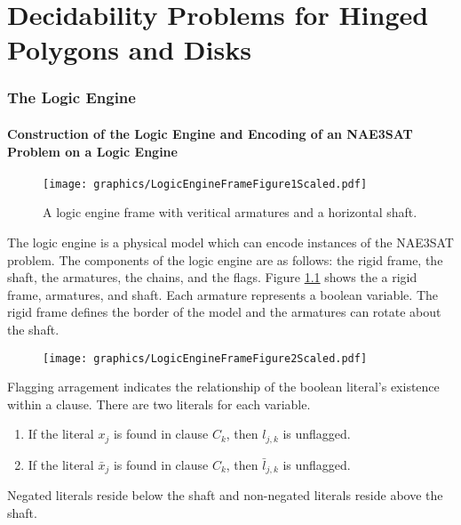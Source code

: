 \chapter{Decidability Problems for Hinged Polygons and Disks}
\subsection{The Logic Engine}
\subsubsection{Construction of the Logic Engine and Encoding of an NAE3SAT Problem on a Logic 
Engine}
\begin{figure}[!h]
\begin{center}
\texttt{[image: graphics/LogicEngineFrameFigure1Scaled.pdf]}
\caption{A logic engine frame with veritical armatures and a horizontal 
shaft.}\label{fig:LogicEngineFrameFigure1.pdf}
\end{center}
\end{figure}
The logic engine is a physical model which can encode instances of the NAE3SAT problem.  The 
components of the logic engine are as follows: the rigid frame, the shaft, the armatures,
the chains, and the flags.  Figure \ref{fig:LogicEngineFrameFigure1.pdf} shows the a rigid frame, 
armatures, and shaft.  Each armature represents a boolean variable.  The rigid frame defines the border 
of the model and the armatures can rotate about the shaft.
\begin{figure}[!h]
\begin{center}
\texttt{[image: graphics/LogicEngineFrameFigure2Scaled.pdf]}
\caption{}\label{fig:LogicEngineFrameFigure2.pdf}
\end{center}
\end{figure}
Flagging arragement indicates the relationship of the boolean literal's existence within a clause.  There are two literals for each variable.  
\begin{enumerate}
 \item If the literal $x_j$ is found in clause $C_k$, then $l_{j,k}$ is unflagged.
 \item If the literal $\bar{x}_j$ is found in clause $C_k$, then $\bar{l}_{j,k}$ is unflagged.
\end{enumerate}
Negated literals reside below the shaft and non-negated literals reside above the shaft.

